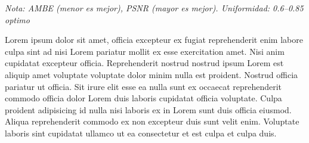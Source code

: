\documentclass[sigchi]{acmart}
\begin{document}
\begin{table}[H]
	\centering
	\caption{Métricas de calidad para la imagen 2015\_00002.png}
	\label{tab:metricas_2015_00002}

	\vspace{0.5em} %


	\vspace{0.5em} %
	\footnotesize%
	\textit{Nota: AMBE (menor es mejor), PSNR (mayor es mejor). Uniformidad: 0.6–0.85 optimo}
\end{table}

Lorem ipsum dolor sit amet, officia excepteur ex fugiat reprehenderit enim labore culpa sint ad
nisi Lorem pariatur mollit ex esse exercitation amet. Nisi anim cupidatat excepteur officia.
Reprehenderit nostrud nostrud ipsum Lorem est aliquip amet voluptate voluptate dolor minim
nulla est proident. Nostrud officia pariatur ut officia. Sit irure elit esse ea nulla sunt ex
occaecat reprehenderit commodo officia dolor Lorem duis laboris cupidatat officia voluptate.
Culpa proident adipisicing id nulla nisi laboris ex in Lorem sunt duis officia eiusmod. Aliqua
reprehenderit commodo ex non excepteur duis sunt velit enim. Voluptate laboris sint cupidatat
ullamco ut ea consectetur et est culpa et culpa duis.
\end{document}
